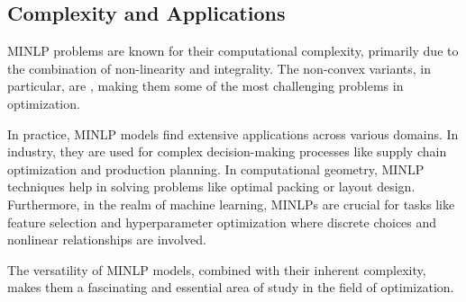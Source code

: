 \subsection*{Complexity and Applications}
MINLP problems are known for their computational complexity, primarily due to the combination of non-linearity and integrality. The non-convex variants, in particular, are \nphard, making them some of the most challenging problems in optimization.

In practice, MINLP models find extensive applications across various domains. In industry, they are used for complex decision-making processes like supply chain optimization and production planning. In computational geometry, MINLP techniques help in solving problems like optimal packing or layout design. Furthermore, in the realm of machine learning, MINLPs are crucial for tasks like feature selection and hyperparameter optimization where discrete choices and nonlinear relationships are involved.

The versatility of MINLP models, combined with their inherent complexity, makes them a fascinating and essential area of study in the field of optimization.



%
%
%
